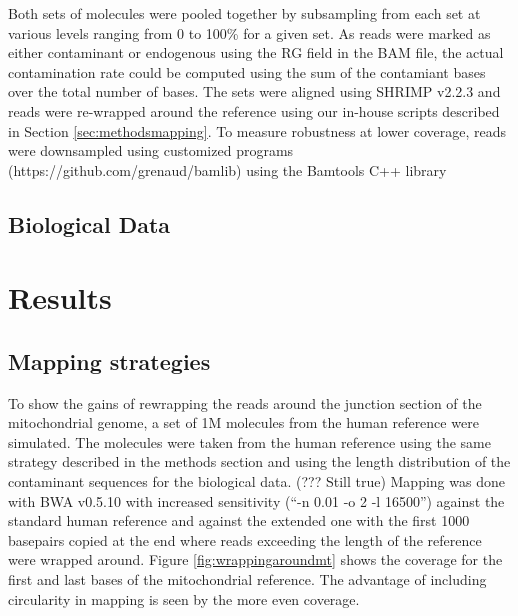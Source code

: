 \documentclass[a4paper,12pt]{article}
\begin{document}
Both sets of molecules were pooled together by subsampling from each set at various levels ranging from 0 to 100\% for a given set. As reads were marked as either contaminant or endogenous using the RG field in the BAM file, the actual contamination rate could be computed using the sum of the contamiant bases over the total number of bases. The sets were aligned using SHRIMP v2.2.3 and reads were re-wrapped around the reference using our in-house scripts described in Section \ref{sec:methodsmapping}. To measure robustness at lower coverage, reads were downsampled using customized programs (https://github.com/grenaud/bamlib) using the Bamtools C++ library \cite{barnett2011bamtools} 



\subsection{Biological Data}

% 


\clearpage






















\clearpage


\section{Results}


\subsection{Mapping strategies}

To show the gains of rewrapping the reads around the junction section of the mitochondrial genome, a set of 1M molecules from the human reference were simulated. The molecules were taken from the human reference using the same strategy described in the methods section and using the length distribution of the contaminant sequences for the biological data. (??? Still true) Mapping was done with BWA v0.5.10 with increased sensitivity (``-n 0.01 -o 2 -l 16500'') against the standard human reference and against the extended one with the first 1000 basepairs copied at the end where reads exceeding the length of the reference were wrapped around. Figure \ref{fig:wrappingaroundmt} shows the coverage for the first and last bases of the mitochondrial reference. The advantage of including circularity in mapping is seen by the more even coverage. 
\end{document}
